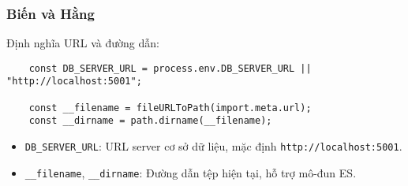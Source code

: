             \subsubsection{Biến và Hằng}
                \hspace*{0.6cm}Định nghĩa URL và đường dẫn:
                \begin{lstlisting}
    const DB_SERVER_URL = process.env.DB_SERVER_URL || "http://localhost:5001";

    const __filename = fileURLToPath(import.meta.url);
    const __dirname = path.dirname(__filename);
                \end{lstlisting}
                \begin{itemize}
                    \item \texttt{DB\_SERVER\_URL}: URL server cơ sở dữ liệu, mặc định \texttt{http://localhost:5001}.
                    \item \texttt{\_\_filename}, \texttt{\_\_dirname}: Đường dẫn tệp hiện tại, hỗ trợ mô-đun ES.
                \end{itemize}

